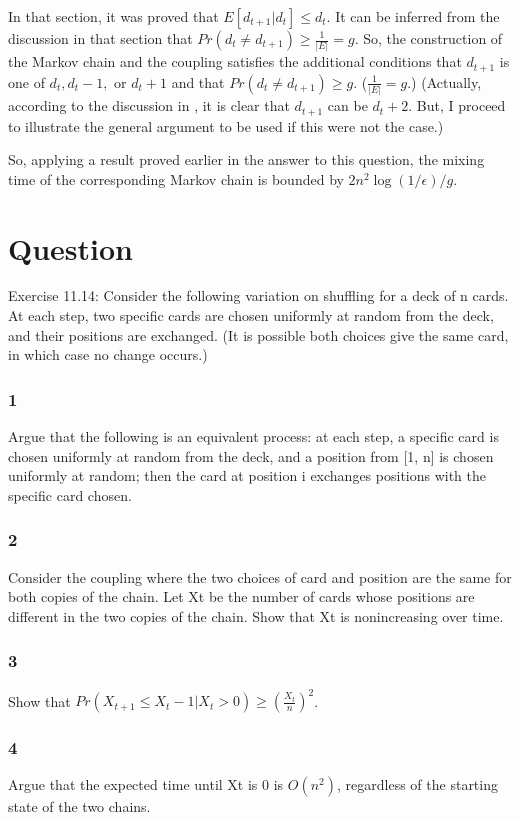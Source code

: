 \documentclass[10pt]{amsart}
\theoremstyle{remark}
\begin{document}
In that section, it was proved that $E[d_{t+1}|d_{t}]\leq d_{t}$. It can be inferred from the discussion in that section that $Pr(d_{t} \neq d_{t+1})\geq \frac{1}{|E|} = g$. So, the construction of the Markov chain and the coupling satisfies the additional conditions that $d_{t+1}$ is one of $d_{t}, d_{t}-1,$ or $d_{t}+1$ and that $Pr(d_{t} \neq d_{t+1})\geq g$. ($\frac{1}{|E|} = g$.) (Actually, according to the discussion in \cite{mitzenmacherUpfal}, it is clear that $d_{t+1}$ can be $d_{t}+2$. But, I proceed to illustrate the general argument to be used if this were not the case.)

So, applying a result proved earlier in the answer to this question, the mixing time of the corresponding Markov chain is bounded by $2n^{2}\log (1/\epsilon)/g$.

\section{Question}
Exercise 11.14: Consider the following variation on shuffling for a deck of n cards. At each step, two specific cards are chosen uniformly at random from the deck, and their positions are exchanged. (It is possible both choices give the same card, in which case no change occurs.)

\subsubsection{1} Argue that the following is an equivalent process: at each step, a specific card is chosen uniformly at random from the deck, and a position from [1, n] is chosen uniformly at random; then the card at position i exchanges positions with the specific card chosen.
\subsubsection{2} Consider the coupling where the two choices of card and position are the same for both copies of the chain. Let Xt be the number of cards whose positions are different in the two copies of the chain. Show that Xt is nonincreasing over time.
\subsubsection{3} Show that
$Pr(X_{t+1} \leq X_{t}-1|X_{t}>0)\geq (\frac{X_{t}}{n})^{2}$.
\subsubsection{4} Argue that the expected time until Xt is 0 is $O(n^{2})$, regardless of the starting state of the two chains.
\end{document}
